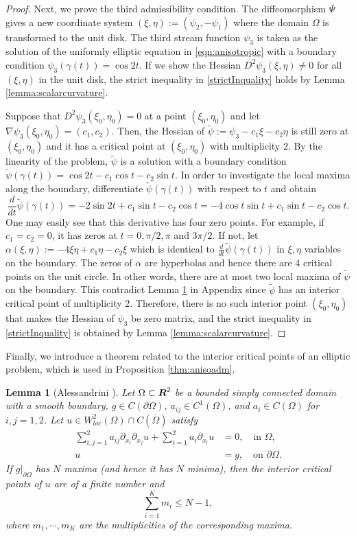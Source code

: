 \documentclass[11pt]{amsart}
\theoremstyle{plain}
\newtheorem{Lem}[Thm]{Lemma}
\theoremstyle{remark}
\numberwithin{equation}{section}
\numberwithin{Thm}{section}
\def\R{\mbox{\boldmath$R$}}
\begin{document}
\begin{proof}
Next, we prove the third admissibility condition. The diffeomorphism $\Psi$ gives a new coordinate system $(\xi,\eta):=(\psi_2,-\psi_1)$ where the domain $\Omega$ is  transformed to the unit disk. The third stream function $\psi_3$ is taken as the solution of the uniformly elliptic equation in \eqref{eqn:anisotropic} with a boundary condition $\psi_3(\gamma(t))=\cos 2t$. If we show the Hessian $D^2\psi_3(\xi,\eta)\ne0$ for all $(\xi,\eta)$ in the unit disk, the strict inequality in \eqref{strictInquality} holds by Lemma \ref{lemma:scalarcurvature}.

Suppose that $D^2\psi_3(\xi_0,\eta_0)=0$ at a point $(\xi_0,\eta_0)$ and let $\nabla \psi_3 (\xi_0,\eta_0) = (c_1,c_2)$. Then, the Hessian of $\tilde\psi:=\psi_3 - c_1\xi - c_2\eta$ is still zero at $(\xi_0,\eta_0)$ and it has a critical point at $(\xi_0,\eta_0)$ with multiplicity $2$. By the linearity of the problem, $\tilde\psi$ is a solution with a boundary condition $\tilde\psi(\gamma(t)) = \cos 2t - c_1\cos t - c_2\sin t$. In order to investigate the local maxima along the boundary, differentiate $\tilde\psi(\gamma(t))$ with respect to $t$ and obtain
$$
{\frac{d}{dt}}\tilde\psi(\gamma(t))= -2\sin 2t + c_1\sin t - c_2\cos t =-4\cos t  \sin  t  + c_1\sin t  - c_2\cos t .
$$
One may easily see that this derivative has four zero points. For example, if $c_1=c_2=0$, it has zeros at $t=0,{\pi/2},\pi$ and $3\pi/2$. If not, let $\alpha(\xi,\eta):=-4\xi\eta + c_1\eta-c_2\xi$ which is identical to ${\frac{d}{dt}}\tilde\psi(\gamma(t))$ in $\xi,\eta$ variables on the boundary. The zeros of $\alpha$ are hyperbolas and hence there are 4 critical points on the unit circle. In other words, there are at most two local maxima of $\tilde\psi$ on the boundary. This contradict Lemma \ref{lem:aless} in Appendix since $\tilde\psi$ has an interior critical point of multiplicity $2$. Therefore, there is no such interior point $(\xi_0,\eta_0)$ that makes the Hessian of $\psi_3$ be zero matrix, and the strict inequality in \eqref{strictInquality} is obtained by Lemma \ref{lemma:scalarcurvature}.
\end{proof}

Finally, we introduce a theorem related to the interior critical points of an elliptic problem, which is used in Proposition \ref{thm:anisoadm}.

\begin{Lem}[Alessandrini \cite{alessandrini_critical_1987}] \label{lem:aless}
Let $\Omega \subset \R^2$ be a bounded simply connected domain with a smooth boundary, $g \in C(\partial\Omega)$, $a_{ij} \in C^1(\Omega)$, and $a_i \in C(\Omega)$ for $i,j=1,2$. Let $u \in W^2_{loc}(\Omega) \cap C(\overline\Omega)$ satisfy
\begin{align*}
  \sum_{i,j=1}^2 a_{ij} \partial_{x_i}\partial_{x_j}u + \sum_{i=1}^2 a_i \partial_{x_i}u &= 0, \quad \text{in $\Omega$,} \\
  u&=g, \quad \text{on $\partial \Omega$}.
\end{align*}
If $g|_{\partial\Omega}$ has $N$ maxima (and hence it has $N$ minima), then the interior critical points of $u$ are of a finite number and
$$
\sum_{i=1}^K m_i \le N-1,
$$
where $m_1,\cdots,m_K$ are the multiplicities of the corresponding maxima.
\end{Lem}
\end{document}
